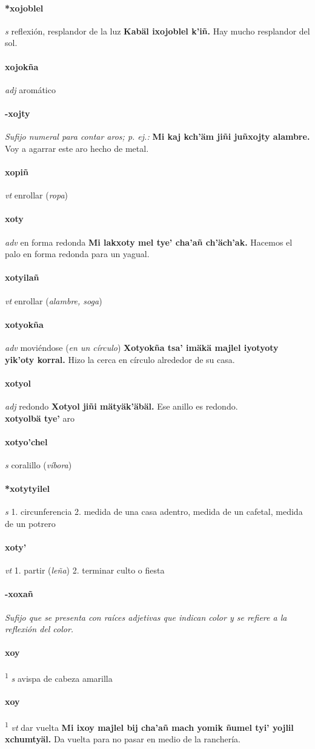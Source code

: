 \documentclass{scrbook}
\newcommand{\entry}[1]{\paragraph{#1}}
\newcommand{\onedefinition}[1]{#1.}
\newcommand{\defsuperscript}[1]{\textsuperscript{1}}
\newcommand{\nontranslationdef}[1]{\textit{#1}}
\newcommand{\partofspeech}[1]{\textit{#1}}
\newcommand{\spanishtranslation}[1]{#1}
\newcommand{\clarification}[1]{(\textit{#1})}
\newcommand{\cholexample}[1]{\textbf{#1}}
\newcommand{\exampletranslation}[1]{#1}
\newcommand{\secondaryentry}[1]{\\\textbf{#1}}
\newcommand{\secondtranslation}[1]{#1}
\begin{document}
\begin{multicols}{2}
\entry{*xojoblel}
\partofspeech{s}
\spanishtranslation{reflexión, resplandor de la luz}
\cholexample{Kabäl ixojoblel k'iñ.}
\exampletranslation{Hay mucho resplandor del sol.}

\entry{xojokña}
\partofspeech{adj}
\spanishtranslation{aromático}

\entry{-xojty}
\nontranslationdef{Sufijo numeral para contar aros; p. ej.:}
\cholexample{Mi kaj kch'äm jiñi juñxojty alambre.}
\exampletranslation{Voy a agarrar este aro hecho de metal.}

\entry{xopiñ}
\partofspeech{vt}
\spanishtranslation{enrollar}
\clarification{ropa}

\entry{xoty}
\partofspeech{adv}
\spanishtranslation{en forma redonda}
\cholexample{Mi lakxoty mel tye' cha'añ ch'äch'ak.}
\exampletranslation{Hacemos el palo en forma redonda para un yagual.}

\entry{xotyilañ}
\partofspeech{vt}
\spanishtranslation{enrollar}
\clarification{alambre, soga}

\entry{xotyokña}
\partofspeech{adv}
\spanishtranslation{moviéndose}
\clarification{en un círculo}
\cholexample{Xotyokña tsa' imäkä majlel iyotyoty yik'oty korral.}
\exampletranslation{Hizo la cerca en círculo alrededor de su casa.}

\entry{xotyol}
\partofspeech{adj}
\spanishtranslation{redondo}
\cholexample{Xotyol jiñi mätyäk'äbäl.}
\exampletranslation{Ese anillo es redondo.}
\secondaryentry{xotyolbä tye'}
\secondtranslation{aro}

\entry{xotyo'chel}
\partofspeech{s}
\spanishtranslation{coralillo}
\clarification{víbora}

\entry{*xotytyilel}
\partofspeech{s}
\onedefinition{1}
\spanishtranslation{circunferencia}
\onedefinition{2}
\spanishtranslation{medida de una casa adentro, medida de un cafetal, medida de un potrero}

\entry{xoty'}
\partofspeech{vt}
\onedefinition{1}
\spanishtranslation{partir}
\clarification{leña}
\onedefinition{2}
\spanishtranslation{terminar culto o fiesta}

\entry{-xoxañ}
\nontranslationdef{Sufijo que se presenta con raíces adjetivas que indican color y se refiere a la reflexión del color.}

\entry{xoy}
\defsuperscript{1}
\partofspeech{s}
\spanishtranslation{avispa de cabeza amarilla}

\entry{xoy}
\defsuperscript{2}
\partofspeech{vt}
\spanishtranslation{dar vuelta}
\cholexample{Mi ixoy majlel bij cha'añ mach yomik ñumel tyi' yojlil xchumtyäl.}
\exampletranslation{Da vuelta para no pasar en medio de la ranchería.}


\end{multicols}
\end{document}
